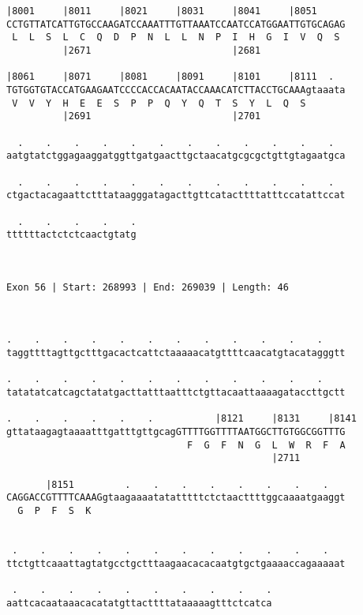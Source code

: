 \documentclass{article}
\begin{document}
\begin{Verbatim}
|8001     |8011     |8021     |8031     |8041     |8051     
CCTGTTATCATTGTGCCAAGATCCAAATTTGTTAAATCCAATCCATGGAATTGTGCAGAG
 L  L  S  L  C  Q  D  P  N  L  L  N  P  I  H  G  I  V  Q  S 
          |2671                         |2681               
  
|8061     |8071     |8081     |8091     |8101     |8111  .  
TGTGGTGTACCATGAAGAATCCCCACCACAATACCAAACATCTTACCTGCAAAgtaaata
 V  V  Y  H  E  E  S  P  P  Q  Y  Q  T  S  Y  L  Q  S       
          |2691                         |2701               
  
  .    .    .    .    .    .    .    .    .    .    .    .  
aatgtatctggagaaggatggttgatgaacttgctaacatgcgcgctgttgtagaatgca
                                                            
  .    .    .    .    .    .    .    .    .    .    .    .  
ctgactacagaattctttataagggatagacttgttcatacttttatttccatattccat
                                                            
  .    .    .    .    .
ttttttactctctcaactgtatg
                       
                       
 
Exon 56 | Start: 268993 | End: 269039 | Length: 46



.    .    .    .    .    .    .    .    .    .    .    .    
taggttttagttgctttgacactcattctaaaaacatgttttcaacatgtacatagggtt
                                                            
.    .    .    .    .    .    .    .    .    .    .    .    
tatatatcatcagctatatgacttatttaatttctgttacaattaaaagataccttgctt
                                                            
.    .    .    .    .    .           |8121     |8131     |8141
gttataagagtaaaatttgatttgttgcagGTTTTGGTTTTAATGGCTTGTGGCGGTTTG
                                F  G  F  N  G  L  W  R  F  A
                                               |2711        
  
       |8151         .    .    .    .    .    .    .    .   
CAGGACCGTTTTCAAAGgtaagaaaatatatttttctctaacttttggcaaaatgaaggt
  G  P  F  S  K                                             
                                                            
  
 .    .    .    .    .    .    .    .    .    .    .    .   
ttctgttcaaattagtatgcctgctttaagaacacacaatgtgctgaaaaccagaaaaat
                                                            
 .    .    .    .    .    .    .    .    .    .
aattcacaataaacacatatgttacttttataaaaagtttctcatca
                                               

\end{Verbatim}
\end{document}

